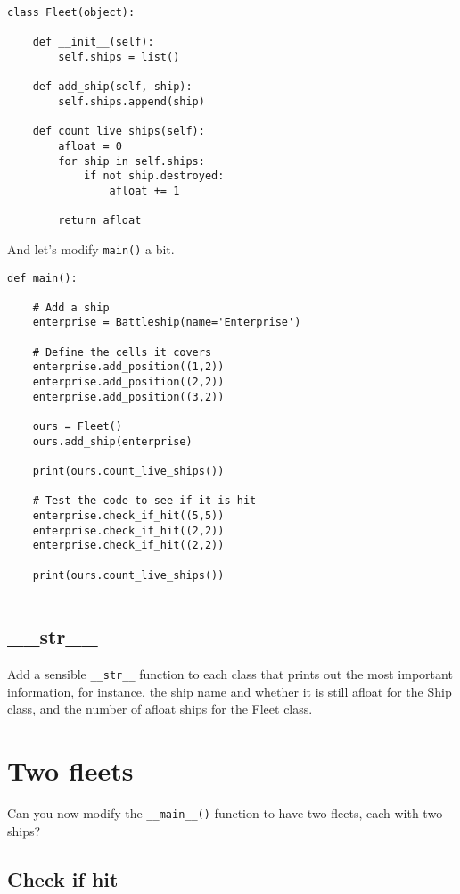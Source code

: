 \documentclass[12pt,oneside]{cttutorial}
\begin{document}
\begin{lstlisting}
class Fleet(object):

    def __init__(self):
        self.ships = list()

    def add_ship(self, ship):
        self.ships.append(ship)

    def count_live_ships(self):
        afloat = 0
        for ship in self.ships:
            if not ship.destroyed:
                afloat += 1

        return afloat
\end{lstlisting}

And let's modify \lstinline!main()! a bit.

\begin{lstlisting}
def main():
    
    # Add a ship
    enterprise = Battleship(name='Enterprise')

    # Define the cells it covers
    enterprise.add_position((1,2))
    enterprise.add_position((2,2))
    enterprise.add_position((3,2))

    ours = Fleet()
    ours.add_ship(enterprise)

    print(ours.count_live_ships())

    # Test the code to see if it is hit
    enterprise.check_if_hit((5,5))
    enterprise.check_if_hit((2,2))
    enterprise.check_if_hit((2,2))

    print(ours.count_live_ships())
    
\end{lstlisting}

\subsection{\_\_str\_\_}

Add a sensible \lstinline!__str__! function to each class that prints out the most important information, for instance, the ship name and whether it is still afloat for the Ship class, and the number of afloat ships for the Fleet class.

\section{Two fleets}

Can you now modify the \lstinline!__main__()! function to have two fleets, each with two ships?

\subsection{Check if hit}
\end{document}

